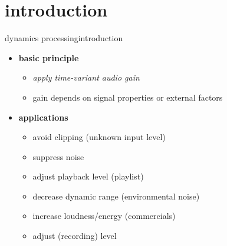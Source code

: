 



\subtitle{Part 21: Dynamics Processing}


	

\section[intro]{introduction}
\begin{frame}{dynamics processing}{introduction}
	\begin{itemize}
		\item	\textbf{basic principle}
			\begin{itemize}
				\item	\textit{apply time-variant audio gain} 
                \item   gain depends on signal properties or external factors
			\end{itemize}
		\pause
        \bigskip
		\item	\textbf{applications}
			\begin{itemize}
				\item	avoid clipping (unknown input level)
				\item	suppress noise
				\item	adjust playback level (playlist)
				\item	decrease dynamic range (environmental noise)
				\item	increase loudness/energy (commercials)
				\item	adjust (recording) level
			\end{itemize}
	\end{itemize}
\end{frame}
